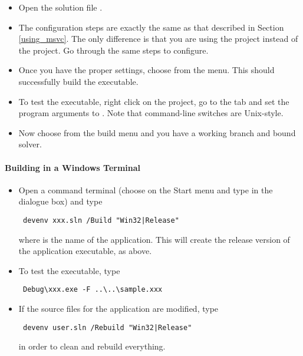 \begin{itemize}

\item Open the solution file .

\item The configuration steps are exactly the same as that described in
  Section \ref{using_msvc}. The only difference is that you are using the
   project instead of the  project. Go through the
  same steps to configure.

\item Once you have the proper settings, choose  from the  menu. This should successfully 
build the executable.

\item
To test the executable, right click on the  project, go to the
 tab and set the program arguments to 
. Note that command-line switches are 
Unix-style.

\item
Now choose  from the build menu and you have a working branch
and bound solver. 

\end{itemize}

\paragraph{Building in a Windows Terminal}
\begin{itemize}
\item Open a command terminal (choose  on the Start menu and type
 in the dialogue box) and type
{\color{Brown}
\begin{verbatim}
 devenv xxx.sln /Build "Win32|Release"
\end{verbatim}
} 
where  is the name of the application. This will create the
release version of the application executable, as above. 

\item To test the executable, type 
{\color{Brown}
\begin{verbatim}
 Debug\xxx.exe -F ..\..\sample.xxx
\end{verbatim}
}
\item If the source files for the application are modified, type 
{\color{Brown}
\begin{verbatim}
 devenv user.sln /Rebuild "Win32|Release"
\end{verbatim}
}
in order to clean and rebuild everything.
\end{itemize} 


